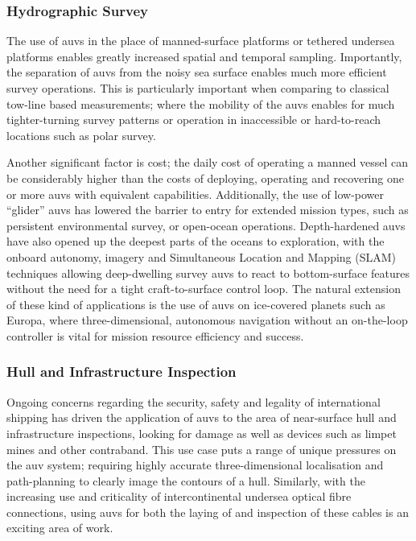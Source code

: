 \subsubsection{Hydrographic Survey}

The use of \glspl{auv} in the place of manned-surface platforms or tethered undersea platforms enables greatly increased spatial and temporal sampling.
Importantly, the separation of \glspl{auv} from the noisy sea surface enables much more efficient survey operations.
This is particularly important when comparing to classical tow-line based measurements; where the mobility of the \glspl{auv} enables for much tighter-turning survey patterns or operation in inaccessible or hard-to-reach locations such as polar survey\cite{Curtin1993}.

Another significant factor is cost; the daily cost of operating a manned vessel can be considerably higher than the costs of deploying, operating and recovering one or more \glspl{auv} with equivalent capabilities\cite{Nicholson2008}.
Additionally, the use of low-power ``glider'' \glspl{auv} has lowered the barrier to entry for extended mission types, such as persistent environmental survey, or open-ocean operations. 
Depth-hardened \glspl{auv} have also opened up the deepest parts of the oceans to exploration, with the onboard autonomy, imagery and Simultaneous Location and Mapping (SLAM) techniques allowing deep-dwelling survey \glspl{auv} to react to bottom-surface features without the need for a tight craft-to-surface control loop.
The natural extension of these kind of applications is the use of \glspl{auv} on ice-covered planets such as Europa, where three-dimensional, autonomous navigation without an on-the-loop controller is vital for mission resource efficiency and success.

\subsubsection{Hull and Infrastructure Inspection}
Ongoing concerns regarding the security, safety and legality of international shipping has driven the application of \glspl{auv} to the area of near-surface hull and infrastructure inspections, looking for damage as well as devices such as limpet mines and other contraband.
This use case puts a range of unique pressures on the \gls{auv} system; requiring highly accurate three-dimensional localisation and path-planning to clearly image the contours of a hull\cite{Nicholson2008}.
Similarly, with the increasing use and criticality of intercontinental undersea optical fibre connections, using \glspl{auv} for both the laying of and inspection of these cables is an exciting area of work\cite{Yu2004,Asakawa2002}.

